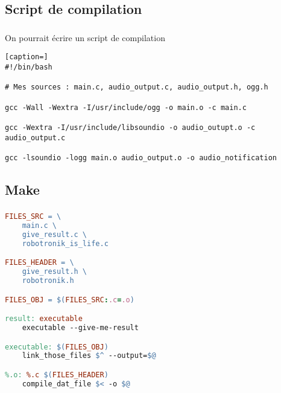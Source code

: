 \subsection{Script de compilation}
\begin{frame}[fragile]
\frametitle{\insertsubsection}

On pourrait écrire un script de compilation\…
\begin{lstlisting}[caption=]
#!/bin/bash

# Mes sources : main.c, audio_output.c, audio_output.h, ogg.h

gcc -Wall -Wextra -I/usr/include/ogg -o main.o -c main.c 

gcc -Wextra -I/usr/include/libsoundio -o audio_outupt.o -c audio_output.c

gcc -lsoundio -logg main.o audio_output.o -o audio_notification

\end{lstlisting}
\end{frame}

\subsection{Make}
\begin{frame}[fragile]
\frametitle{\insertsubsection}

\begin{lstlisting}[language=make, title=Un Makefile classique]
FILES_SRC = \
    main.c \
    give_result.c \
    robotronik_is_life.c

FILES_HEADER = \
    give_result.h \
    robotronik.h

FILES_OBJ = $(FILES_SRC:.c=.o)

result: executable
    executable --give-me-result

executable: $(FILES_OBJ)
    link_those_files $^ --output=$@

%.o: %.c $(FILES_HEADER)
    compile_dat_file $< -o $@
\end{lstlisting}
\end{frame}

